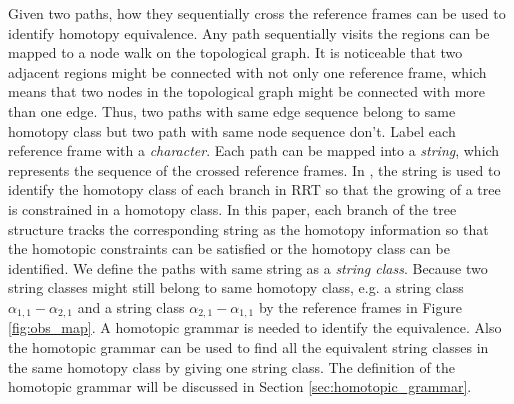 \documentclass[letterpaper, 10 pt, conference]{ieeeconf}
\begin{document}
Given two paths, how they sequentially cross the reference frames can be used to identify homotopy equivalence.
Any path sequentially visits the regions can be mapped to a node walk on the topological graph.
It is noticeable that two adjacent regions might be connected with not only one reference frame, which means that two nodes in the topological graph might be connected with more than one edge.
Thus, two paths with same edge sequence belong to same homotopy class but two path with same node sequence don't.  
Label each reference frame with a \emph{character}.
Each path can be mapped into a {\em string}, which represents the sequence of the crossed reference frames.
In \cite{Hernandez201544}, the string is used to identify the homotopy class of each branch in RRT so that the growing of a tree is constrained in a homotopy class.
In this paper, each branch of the tree structure tracks the corresponding string as the homotopy information so that the homotopic constraints can be satisfied or the homotopy class can be identified.
We define the paths with same string as a \emph{string class}.
Because two string classes might still belong to same homotopy class, e.g. a string class $ \alpha_{1,1}-\alpha_{2,1} $ and a string class $ \alpha_{2,1}-\alpha_{1,1} $ by the reference frames in Figure \ref{fig:obs_map}.
A homotopic grammar is needed to identify the equivalence.
Also the homotopic grammar can be used to find all the equivalent string classes in the same homotopy class by giving one string class.
The definition of the homotopic grammar will be discussed in Section \ref{sec:homotopic_grammar}.



\end{document}
